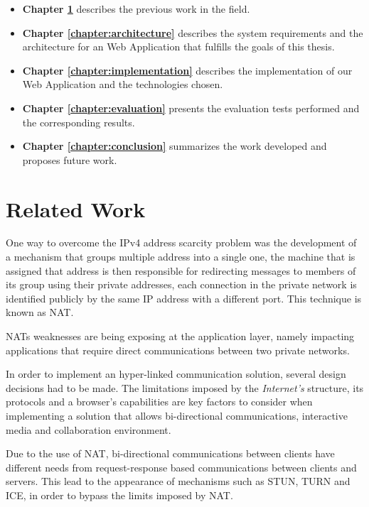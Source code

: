 \documentclass[conference,compsoc,a4paper]{IEEEtran}
\begin{document}
\begin{itemize}

\item \textbf{Chapter \ref{chapter:relatedwork}} describes the previous work in the field.
\item \textbf{Chapter \ref{chapter:architecture}} describes the system requirements and the architecture for an Web Application that fulfills the goals of this thesis.
\item \textbf{Chapter \ref{chapter:implementation}} describes the implementation of our Web Application and the technologies chosen.
\item \textbf{Chapter \ref{chapter:evaluation}} presents the evaluation tests performed and the corresponding results.
\item \textbf{Chapter \ref{chapter:conclusion}} summarizes the work developed and proposes future work.
\end{itemize}

\section{Related Work}
\label{chapter:relatedwork}

One way to overcome the \gls{IPv4} address scarcity problem \cite{ipv4} was the development of a mechanism that groups multiple address into a single one, the machine that is assigned that address is then responsible for redirecting messages to members of its group using their private addresses, each connection in the private network is identified publicly by the same \gls{IP} address with a different port. This technique is known as \gls{NAT}\cite{rfc3489}.

\gls{NAT}s weaknesses are being exposing at the application layer, namely impacting applications that require direct communications between two private networks.

In order to implement an hyper-linked communication solution, several design decisions had to be made. The limitations imposed by the \emph{Internet's} structure, its protocols and a browser's capabilities are key factors to consider when implementing a solution that allows bi-directional communications, interactive media and collaboration environment.

Due to the use of \gls{NAT}, bi-directional communications between clients have different needs from request-response based communications between clients and servers.
This lead to the appearance of mechanisms such as \gls{STUN}, \gls{TURN} and \gls{ICE}, in order to bypass the limits imposed by \gls{NAT}.
\end{document}
